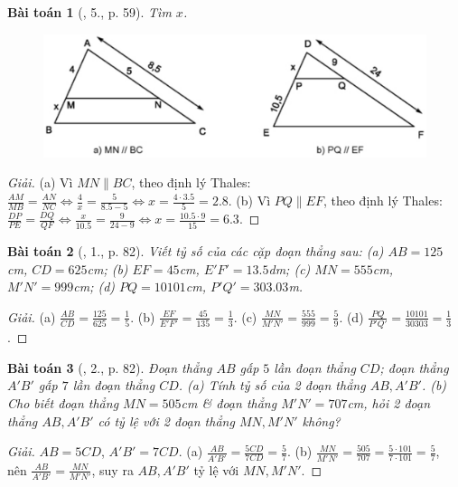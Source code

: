 \documentclass{article}
\newtheorem{baitoan}{Bài toán}
\begin{document}
\begin{baitoan}[\cite{SGK_Toan_8_tap_2}, 5., p. 59]
	Tìm $x$.
	\begin{figure}[H]
		\centering
		\includegraphics[scale=0.2]{SGK_Toan_8_7}
	\end{figure}
\end{baitoan}

\begin{proof}[Giải]
	(a) Vì $MN\parallel BC$, theo định lý Thales: $\frac{AM}{MB} = \frac{AN}{NC}\Leftrightarrow\frac{4}{x} = \frac{5}{8.5 - 5}\Leftrightarrow x = \frac{4\cdot3.5}{5} = 2.8$. (b) Vì $PQ\parallel EF$, theo định lý Thales: $\frac{DP}{PE} = \frac{DQ}{QF}\Leftrightarrow\frac{x}{10.5} = \frac{9}{24 - 9}\Leftrightarrow x = \frac{10.5\cdot9}{15} = 6.3$.
\end{proof}

\begin{baitoan}[\cite{SBT_Toan_8_tap_2}, 1., p. 82]
	Viết tỷ số của các cặp đoạn thẳng sau: (a) $AB = 125$\emph{cm}, $CD = 625$\emph{cm}; (b) $EF = 45$\emph{cm}, $E'F' = 13.5$\emph{dm}; (c) $MN = 555$\emph{cm}, $M'N' = 999$\emph{cm}; (d) $PQ = 10101$\emph{cm}, $P'Q' = 303.03$\emph{m}.	
\end{baitoan}

\begin{proof}[Giải]
	(a) $\frac{AB}{CD} = \frac{125}{625} = \frac{1}{5}$. (b) $\frac{EF}{E'F'} = \frac{45}{135} = \frac{1}{3}$. (c) $\frac{MN}{M'N'} = \frac{555}{999} = \frac{5}{9}$. (d) $\frac{PQ}{P'Q'} = \frac{10101}{30303} = \frac{1}{3}$.
\end{proof}

\begin{baitoan}[\cite{SBT_Toan_8_tap_2}, 2., p. 82]
	Đoạn thẳng $AB$ gấp $5$ lần đoạn thẳng $CD$; đoạn thẳng $A'B'$ gấp $7$ lần đoạn thẳng $CD$. (a) Tính tỷ số của 2 đoạn thẳng $AB,A'B'$. (b) Cho biết đoạn thẳng $MN = 505$\emph{cm} \& đoạn thẳng $M'N' = 707$\emph{cm}, hỏi 2 đoạn thẳng $AB,A'B'$ có tỷ lệ với 2 đoạn thẳng $MN,M'N'$ không?
\end{baitoan}

\begin{proof}[Giải]
	$AB = 5CD$, $A'B' = 7CD$. (a) $\frac{AB}{A'B'} = \frac{5CD}{7CD} = \frac{5}{7}$. (b) $\frac{MN}{M'N'} = \frac{505}{707} = \frac{5\cdot101}{7\cdot101} = \frac{5}{7}$, nên $\frac{AB}{A'B'} = \frac{MN}{M'N'}$, suy ra $AB,A'B'$ tỷ lệ với $MN,M'N'$.
\end{proof}
\end{document}

